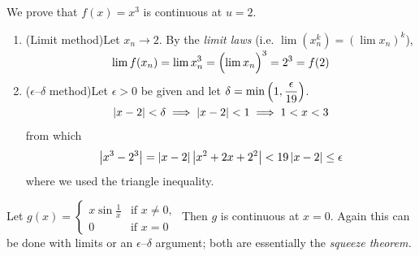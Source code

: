 \begin{examples}{}{}
	\exstart We prove that $f(x)=x^3$ is continuous at $u=2$.
	\begin{enumerate}\setcounter{enumi}{1}
		\item[]\begin{enumerate}
	  	\item (Limit method)\quad Let $x_n\to 2$. By the \emph{limit laws} (i.e. $\lim(x_n^k)=\left(\lim x_n\right)^k$),
			\[
				\lim f(x_n)=\lim x_n^3=\smash{\Bigl(\lim x_n\Bigr)^3}=2^3=f(2)
			\]
	  	\item ($\epsilon$--$\delta$ method)\quad Let $\epsilon>0$ be given and let $\displaystyle\delta=\smash{\min\left(1,\frac{\epsilon}{19}\right)}$.
			\[
				\left| x-2\right|<\delta\implies \left| x-2\right|<1\implies 1<x<3
			\]
			from which
			\[
				\left| x^3-2^3\right|		
				=\left| x-2\right|\left| x^2+2x+2^2\right|
				<19\left| x-2\right|\le\epsilon
			\]
			where we used the triangle inequality.
		\end{enumerate}
	
		\begin{minipage}[t]{0.70\linewidth}\vspace{0pt}
			\item Let $g(x)=
			\begin{cases}
				x\sin\frac 1x&\text{if }x\neq 0,\\
				0&\text{if }x=0
			\end{cases}$
			\smallbreak
			Then $g$ is continuous at $x=0$. Again this can be done with limits or an $\epsilon$--$\delta$ argument; both are essentially the \emph{squeeze theorem.}
	  

\end{minipage}
\end{enumerate}
\end{examples}

